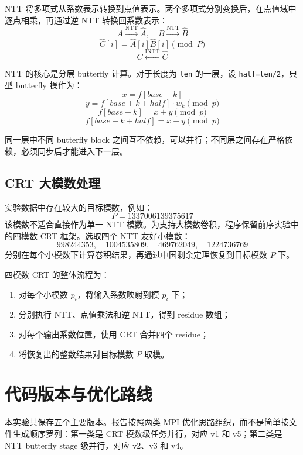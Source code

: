\documentclass[a4paper]{article}
\begin{document}
NTT 将多项式从系数表示转换到点值表示。两个多项式分别变换后，在点值域中逐点相乘，再通过逆 NTT 转换回系数表示：
\[
A \xrightarrow{\mathrm{NTT}} \hat{A},\quad
B \xrightarrow{\mathrm{NTT}} \hat{B}
\]
\[
\hat{C}[i]=\hat{A}[i]\hat{B}[i]\pmod P
\]
\[
C \xleftarrow{\mathrm{INTT}} \hat{C}
\]

NTT 的核心是分层 butterfly 计算。对于长度为 \texttt{len} 的一层，设 \texttt{half=len/2}，典型 butterfly 操作为：
\[
x=f[base+k]
\]
\[
y=f[base+k+half]\cdot w_k\pmod p
\]
\[
f[base+k]=x+y\pmod p
\]
\[
f[base+k+half]=x-y\pmod p
\]

同一层中不同 butterfly block 之间互不依赖，可以并行；不同层之间存在严格依赖，必须同步后才能进入下一层。

\subsection{CRT 大模数处理}

实验数据中存在较大的目标模数，例如：
\[
P=1337006139375617
\]
该模数不适合直接作为单一 NTT 模数。为支持大模数卷积，程序保留前序实验中的四模数 CRT 框架。选取四个 NTT 友好小模数：
\[
998244353,\quad 1004535809,\quad 469762049,\quad 1224736769
\]
分别在每个小模数下计算卷积结果，再通过中国剩余定理恢复到目标模数 $P$ 下。

四模数 CRT 的整体流程为：
\begin{enumerate}
    \item 对每个小模数 $p_i$，将输入系数映射到模 $p_i$ 下；
    \item 分别执行 NTT、点值乘法和逆 NTT，得到 residue 数组；
    \item 对每个输出系数位置，使用 CRT 合并四个 residue；
    \item 将恢复出的整数结果对目标模数 $P$ 取模。
\end{enumerate}

\section{代码版本与优化路线}

本实验共保存五个主要版本。报告按照两类 MPI 优化思路组织，而不是简单按文件生成顺序罗列：第一类是 CRT 模数级任务并行，对应 v1 和 v5；第二类是 NTT butterfly stage 级并行，对应 v2、v3 和 v4。
\end{document}
